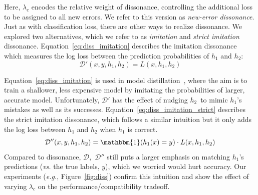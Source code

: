 \documentclass[letterpaper]{article}
\newcommand{\eg}{\mbox{\it e.g.}}
\newcommand{\hone}{\mbox{$h_1$}}
\newcommand{\htwo}{\mbox{$h_2$}}
\newcommand{\loss}{L}
\newcommand{\lambdabc}{\lambda_c}
\newcommand{\dissonance}{\mathcal{D}}
\begin{document}
\noindent Here, $\lambdabc$ encodes the relative weight of dissonance, controlling the additional loss to be assigned to all new errors.
We refer to this version as {\em new-error dissonance}.
Just as with classification loss, there are other ways to realize dissonance. We explored two alternatives, which we refer to as {\em imitation} and {\em strict imitation} dissonance.
Equation~\ref{eq:diss_imitation} describes the imitation dissonance which measures the log loss between the prediction probabilities of $\hone$ and $\htwo$:
\begin{equation}
    \label{eq:diss_imitation}
    \dissonance'(x, y, \hone, \htwo) = \loss(x, \hone, \htwo)
\end{equation}

\noindent Equation~\ref{eq:diss_imitation} is used in model distillation~\cite{ba2014deep,hinton2015distilling}, where the aim is to train a shallower, less expensive model by imitating the probabilities of larger, accurate model. Unfortunately, $\dissonance'$ has the effect of nudging \htwo\ to mimic \hone's mistakes as well as its successes.  
Equation~\ref{eq:diss_imitation_strict} describes the strict imitation dissonance, which follows a similar intuition but it only adds the log loss between $\hone$ and $\htwo$ when $\hone$ is correct.
\begin{equation}
    \label{eq:diss_imitation_strict}
    \dissonance''(x, y, \hone, \htwo) = \mathbbm{1}(\hone(x) = y) \cdot \loss(x, \hone, \htwo)
\end{equation}
\noindent Compared to dissonance, $\dissonance,$  $\dissonance''$ still puts a larger emphasis on matching \hone's predictions ({\em vs.} the true labels, $y$), which we worried would hurt accuracy. Our experiments (\eg, Figure~\ref{fig:diss}) confirm this intuition and show the effect of varying
$\lambdabc$ on the performance/compatibility tradeoff. %
\end{document}
